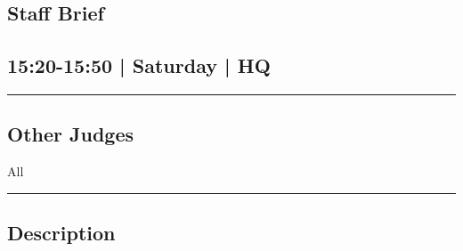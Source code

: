 \documentclass[10pt, A5]{article}
\begin{document}
	

		\begin{framed}
			\begin{minipage}{\textwidth}

			\setcounter{section}{53}
							\section{Staff Brief}
						
			\subsection*{15:20-15:50 | Saturday | HQ}

			\vspace{0.25cm}
			\hrule
			\vspace{0.25cm}


			\subsection*{Other Judges}
							All

					\vspace{0.25cm}
			\hrule
			\vspace{0.25cm}

			\begin{minipage}{\textwidth}
			\subsection*{\faListAlt \: Description}
			
			\end{minipage}


	\end{minipage}
	\end{framed}

	
\end{document}
